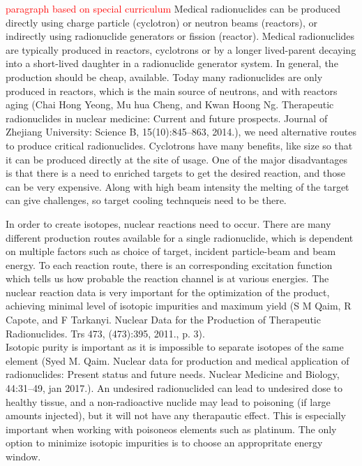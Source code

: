 \textcolor{red}{paragraph based on special curriculum}
Medical radionuclides can be produced directly using charge particle (cyclotron) or neutron beams (reactors), or indirectly using radionuclide generators or fission (reactor). Medical radionuclides are typically produced in reactors, cyclotrons or by a longer lived-parent decaying into a short-lived daughter in a radionuclide generator system. In general, the production should be cheap, available. Today many radionuclides are only produced in reactors, which is the main source of neutrons, and with reactors aging (Chai Hong Yeong, Mu hua Cheng, and Kwan Hoong Ng. Therapeutic radionuclides in nuclear medicine: Current and future prospects. Journal of Zhejiang University: Science B,
15(10):845–863, 2014.), we need alternative routes to produce critical radionuclides. Cyclotrons have many benefits, like size so that it can be produced directly at the site of usage. One of the major disadvantages is that there is a need to enriched targets to get the desired reaction, and those can be very expensive. Along with high beam intensity the melting of the target can give challenges, so target cooling technqueis need to be there.    

In order to create isotopes, nuclear reactions need to occur. There are many different production routes available for a single radionuclide, which is dependent on multiple factors such as choice of target, incident particle-beam and beam energy. To each reaction route, there is an corresponding excitation function which tells us how probable the reaction channel is at various energies. The nuclear reaction data is very important for the optimization of the product, achieving minimal level of isotopic impurities and maximum yield (S M Qaim, R Capote, and F Tarkanyi. Nuclear Data for the Production of Therapeutic Radionuclides.
Trs 473, (473):395, 2011., p. 3). \\

Isotopic purity is important as it is impossible to separate isotopes of the same element (Syed M. Qaim. Nuclear data for production and medical application of radionuclides:
Present status and future needs. Nuclear Medicine and Biology, 44:31–49, jan 2017.). An undesired radionuclided can lead to undesired dose to healthy tissue, and a non-radioactive nuclide may lead to  poisoning (if large amounts injected), but it will not have any therapautic effect. This is especially important when working with poisoneos elements such as platinum. The only option to minimize isotopic impurities is to choose an appropritate energy window. 


